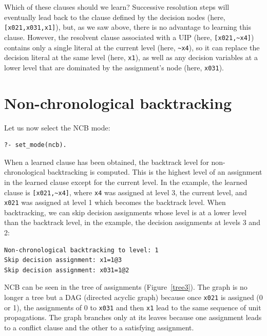 \documentclass[11pt]{article}
\newcommand*{\p}[1]{\textup{\texttt{#1}}}
\begin{document}
Which of these clauses should we learn? Successive resolution steps will
eventually lead back to the clause defined by the decision nodes (here,
\verb+[x021,x031,x1]+), but, as we saw above, there is no advantage to
learning this clause. However, the resolvent clause associated with a
UIP (here, \verb+[x021,~x4]+) contains only a single literal at the
current level (here, \verb+~x4+), so it can replace the decision literal
at the same level (here, \verb+x1+), as well as any decision variables
at a lower level that are dominated by the assignment's node (here,
\verb+x031+).


\clearpage

\section{Non-chronological backtracking}

Let us now select the NCB mode:
\begin{verbatim}
?- set_mode(ncb).
\end{verbatim}

When a learned clause has been obtained, the backtrack level for
non-chronological backtracking is computed. This is the highest level of
an assignment in the learned clause except for the current level. In the
example, the learned clause is \verb+[x021,~x4]+, where \p{x4} was
assigned at level 3, the current level, and \p{x021} was assigned at
level 1 which becomes the backtrack level. When backtracking, we can
skip decision assignments whose level is at a lower level than the
backtrack level, in the example, the decision assignments at levels 3
and 2:

\begin{verbatim}
Non-chronological backtracking to level: 1
Skip decision assignment: x1=1@3
Skip decision assignment: x031=1@2
\end{verbatim}

NCB can be seen in the tree of assignments (Figure~\ref{tree3}). The
graph is no longer a tree but a DAG (directed acyclic graph) because
once \p{x021} is assigned (0 or 1), the assignments of 0 to \p{x031} and
then \p{x1} lead to the same sequence of unit propagations. The graph
branches only at its leaves because one assignment leads to a conflict
clause and the other to a satisfying assignment.
\end{document}
